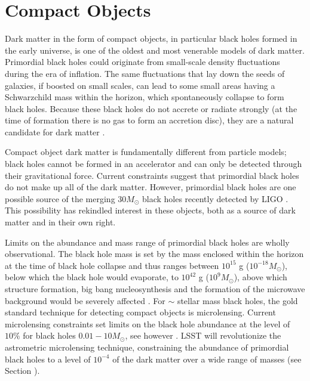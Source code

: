 \section{Compact Objects }
\label{sec:machos}


Dark matter in the form of compact objects, in particular black holes formed in the early universe, is one of the oldest and most venerable models of dark matter. Primordial black holes could originate from small-scale density fluctuations during the era of inflation. The same fluctuations that lay down the seeds of galaxies, if boosted on small scales, can lead to some small areas having a Schwarzchild mass within the horizon, which spontaneously collapse to form black holes. Because these black holes do not accrete or radiate strongly (at the time of formation there is no gas to form an accretion disc), they are a natural candidate for dark matter \citep{Carr:1974nx,Carr:2016drx}. 

Compact object dark matter is fundamentally different from particle models; black holes cannot be formed in an accelerator and can only be detected through their gravitational force. Current constraints suggest that primordial black holes do not make up all of the dark matter. However, primordial black holes are one possible source of the merging $30 M_\odot$ black holes recently detected by LIGO \citep{Bird:2016,Clesse:2016}. This possibility has rekindled interest in these objects, both as a source of dark matter and in their own right.

Limits on the abundance and mass range of primordial black holes are wholly observational. The black hole mass is set by the mass enclosed within the horizon at the time of black hole collapse and thus ranges between $10^{15}$ g ($10^{-18} M_\odot$), below which the black hole would evaporate, to $10^{42}$ g  ($10^9 M_\odot$), above which structure formation, big bang nucleosynthesis and the formation of the microwave background would be severely affected \citep{Sasaki:2018}. 
For $\sim $ stellar mass black holes, the gold standard technique for detecting compact objects is microlensing. Current microlensing constraints set limits on the black hole abundance at the level of $10\%$ for black holes $0.01 - 10 M_\odot$, see however \citep{2018MNRAS.479.2889C}. LSST will revolutionize the astrometric microlensing technique,  constraining the abundance of primordial black holes to a level of $10^{-4}$ of the dark matter over a wide range of masses (see Section ).

